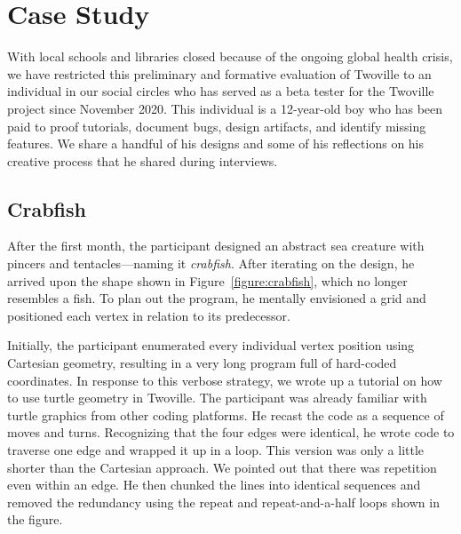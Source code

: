 \section{Case Study}
\label{section:case_study}

With local schools and libraries closed because of the ongoing global health crisis, we have restricted this preliminary and formative evaluation of Twoville to an individual in our social circles who has served as a beta tester for the Twoville project since November 2020. This individual is a 12-year-old boy who has been paid to proof tutorials, document bugs, design artifacts, and identify missing features. We share a handful of his designs and some of his reflections on his creative process that he shared during interviews.

\subsection{Crabfish}

After the first month, the participant designed an abstract sea creature with pincers and tentacles---naming it {\em crabfish}. After iterating on the design, he arrived upon the shape shown in Figure~\ref{figure:crabfish}, which no longer resembles a fish. To plan out the program, he mentally envisioned a grid and positioned each vertex in relation to its predecessor.

Initially, the participant enumerated every individual vertex position using Cartesian geometry, resulting in a very long program full of hard-coded coordinates. In response to this verbose strategy, we wrote up a tutorial on how to use turtle geometry in Twoville. The participant was already familiar with turtle graphics from other coding platforms. He recast the code as a sequence of moves and turns. Recognizing that the four edges were identical, he wrote code to traverse one edge and wrapped it up in a loop. This version was only a little shorter than the Cartesian approach. We pointed out that there was repetition even within an edge. He then chunked the lines into identical sequences and removed the redundancy using the repeat and repeat-and-a-half loops shown in the figure.

